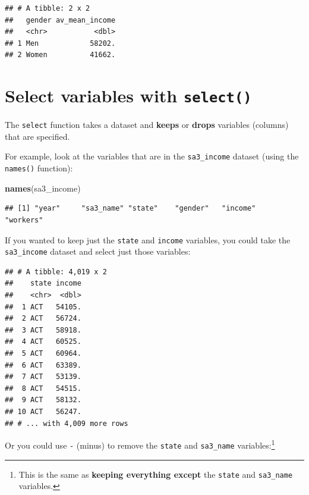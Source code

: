 \documentclass[]{book}
\newenvironment{Shaded}{\begin{snugshade}}{\end{snugshade}}
\newcommand{\KeywordTok}[1]{\textcolor[rgb]{0.13,0.29,0.53}{\textbf{#1}}}
\newcommand{\NormalTok}[1]{#1}
\newcommand{\OperatorTok}[1]{\textcolor[rgb]{0.81,0.36,0.00}{\textbf{#1}}}
\newcommand{\StringTok}[1]{\textcolor[rgb]{0.31,0.60,0.02}{#1}}
\begin{document}
\begin{verbatim}
## # A tibble: 2 x 2
##   gender av_mean_income
##   <chr>           <dbl>
## 1 Men            58202.
## 2 Women          41662.
\end{verbatim}

\hypertarget{select-variables-with-select}{%
\section{\texorpdfstring{Select variables with \texttt{select()}}{Select variables with select()}}\label{select-variables-with-select}}

The \texttt{select} function takes a dataset and \textbf{keeps} or \textbf{drops} variables (columns) that are specified.

For example, look at the variables that are in the \texttt{sa3\_income} dataset (using the \texttt{names()} function):

\begin{Shaded}
\begin{Highlighting}[]
\KeywordTok{names}\NormalTok{(sa3_income)}
\end{Highlighting}
\end{Shaded}

\begin{verbatim}
## [1] "year"     "sa3_name" "state"    "gender"   "income"   "workers"
\end{verbatim}

If you wanted to keep just the \texttt{state} and \texttt{income} variables, you could take the \texttt{sa3\_income} dataset and select just those variables:

\begin{Shaded}
\end{Shaded}

\begin{verbatim}
## # A tibble: 4,019 x 2
##    state income
##    <chr>  <dbl>
##  1 ACT   54105.
##  2 ACT   56724.
##  3 ACT   58918.
##  4 ACT   60525.
##  5 ACT   60964.
##  6 ACT   63389.
##  7 ACT   53139.
##  8 ACT   54515.
##  9 ACT   58132.
## 10 ACT   56247.
## # ... with 4,009 more rows
\end{verbatim}

Or you could use \texttt{-} (minus) to remove the \texttt{state} and \texttt{sa3\_name} variables:\footnote{This is the same as \textbf{keeping everything except} the \texttt{state} and \texttt{sa3\_name} variables.}
\end{document}
